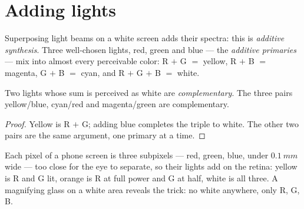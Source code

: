 \section{Adding lights}

\begin{definition}\label{def:g11:color-light-sources:additive}
Superposing light beams on a white screen adds their spectra: this is
\emph{additive synthesis}. Three well-chosen
lights, red, green and blue --- the \emph{additive
primaries} --- mix into almost every perceivable
color: R $+$ G $=$ yellow, R $+$ B $=$ magenta, G $+$ B $=$ cyan, and
R $+$ G $+$ B $=$ white.
\end{definition}

\begin{proposition}\label{prop:g11:color-light-sources:complementary}
Two lights whose sum is perceived as white are
\emph{complementary}. The three pairs
yellow/blue, cyan/red and magenta/green are complementary.
\end{proposition}

\begin{proof}
Yellow is R $+$ G; adding blue completes the triple to white. The other
two pairs are the same argument, one primary at a time.
\end{proof}

\begin{example}[Screens]\label{ex:g11:color-light-sources:screen}
Each pixel of a phone screen is three subpixels --- red, green, blue,
under $\qty{0.1}{mm}$ wide --- too close for the eye to separate, so
their lights add on the retina: yellow is R and G lit, orange is R at
full power and G at half, white is all three. A magnifying glass on a
white area reveals the trick: no white anywhere, only R, G, B.
\end{example}

